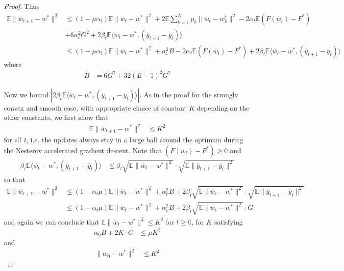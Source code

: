 \begin{proof}
	Thus 
	\begin{align*}
	\mathbb{E}\|\overline{w}_{t+1}-w^{\ast}\|^{2} & \leq(1-\mu\alpha_{t})\mathbb{E}\|\overline{w}_{t}-w^{\ast}\|^{2}+2\mathbb{E}\sum_{k=1}^{N}p_{k}\|\overline{w}_{t}-w_{k}^{t}\|^{2}-2\alpha_{t}\mathbb{E}(F(\overline{w}_{t})-F^{\ast})\\
	& +6\alpha_{t}^{2}G^{2}+2\beta_{t}\mathbb{E}\langle\overline{w}_{t}-w^{\ast},(\overline{y}_{t+1}-\overline{y}_{t})\rangle\\
	& \leq(1-\mu\alpha_{t})\mathbb{E}\|\overline{w}_{t}-w^{\ast}\|^{2}+\alpha_{t}^{2}B-2\alpha_{t}\mathbb{E}(F(\overline{w}_{t})-F^{\ast})+2\beta_{t}\mathbb{E}\langle\overline{w}_{t}-w^{\ast},(\overline{y}_{t+1}-\overline{y}_{t})\rangle
	\end{align*}
	where 
	\begin{align*}
	B & =6G^{2}+32(E-1)^{2}G^{2}
	\end{align*}
	
	Now we bound $|2\beta_{t}\mathbb{E}\langle\overline{w}_{t}-w^{\ast},(\overline{y}_{t+1}-\overline{y}_{t})\rangle|$.
	As in the proof for the strongly convex and smooth case, with appropriate
	choice of constant $K$ depending on the other constants, we first
	show that 
	\begin{align*}
	\mathbb{E}\|\overline{w}_{t+1}-w^{\ast}\|^{2} & \leq K^{2}
	\end{align*}
	for all $t$, i.e. the updates always stay in a large ball around
	the optimum during the Nesterov accelerated gradient descent. Note
	that $(F(\overline{w}_{t})-F^{\ast})\geq0$ and 
	\begin{align*}
	\beta_{t}\mathbb{E}\langle\overline{w}_{t}-w^{\ast},(\overline{y}_{t+1}-\overline{y}_{t})\rangle & \leq\beta_{t}\sqrt{\mathbb{E}\|\overline{w}_{t}-w^{\ast}\|^{2}}\cdot\sqrt{\mathbb{E}\|\overline{y}_{t+1}-\overline{y}_{t}\|^{2}}
	\end{align*}
	so that 
	\begin{align*}
	\mathbb{E}\|\overline{w}_{t+1}-w^{\ast}\|^{2} & \leq(1-\alpha_{t}\mu)\mathbb{E}\|\overline{w}_{t}-w^{\ast}\|^{2}+\alpha_{t}^{2}B+2\beta_{t}\sqrt{\mathbb{E}\|\overline{w}_{t}-w^{\ast}\|^{2}}\cdot\sqrt{\mathbb{E}\|\overline{y}_{t+1}-\overline{y}_{t}\|^{2}}\\
	& \leq(1-\alpha_{t}\mu)\mathbb{E}\|\overline{w}_{t}-w^{\ast}\|^{2}+\alpha_{t}^{2}B+2\beta_{t}\sqrt{\mathbb{E}\|\overline{w}_{t}-w^{\ast}\|^{2}}\cdot G
	\end{align*}
	and again we can conclude that $\mathbb{E}\|\overline{w}_{t}-w^{\ast}\|^{2}\leq K^{2}$
	for $t\geq0$, for $K$ satisfying 
	\begin{align*}
	\alpha_{0}B+2K\cdot G & \leq\mu K^{2}
	\end{align*}
	and
	\begin{align*}
	\|w_{0}-w^{\ast}\|^{2} & \leq K^{2}
	\end{align*}
	

\end{proof}
